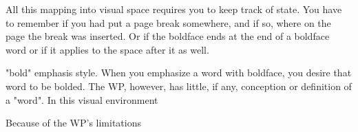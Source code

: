 \documentclass[12pt]{article}
\begin{document}

All this mapping into visual space requires you to keep track of state. You have to remember if you had put a page break somewhere, and if so, where on the page the break was inserted. Or if the boldface ends at the end of a boldface word or if it applies to the space after it as well.

"bold" emphasis style. When you emphasize a word with boldface, you desire that word to be bolded. The WP, however, has little, if any, conception or definition of a "word". In this visual environment

Because of the WP's limitations

\end{document}
